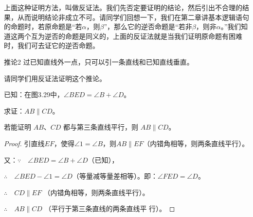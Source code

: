上面这种证明方法，叫做反证法。我们先否定要证明的结论，然后引出不合理的结果，从而说明结论非成立不可。请同学们回想一下，我们在第二章讲基本逻辑语句的命题时，若原命题是“若$\alpha$，则$\beta$”，那么它的逆否命题是“若非$\beta$，则非$\alpha$。”我们知道这两个互为逆否的命题是同义的，上面的反证法就是当我们证明原命题有困难时，我们可去证它的逆否命题。

\begin{Deduction}{推论2} 
  过已知直线外一点，只可以引一条直线和已知直线垂直。   
\end{Deduction}

请同学们用反证法证明这个推论。

\begin{example}
已知：在图3.29中，$\angle BED=\angle B+\angle D$。

求证：$AB\parallel CD$。
\end{example}

\begin{analyze}
若能证明 $AB$、$CD$ 都与第三条直线平行，则 $AB\parallel CD$。
\end{analyze}

\begin{proof}
引直线$EF$，使得$\angle 1=\angle B$，则$AB\parallel EF$（内错角相等，则两条直线平行）。

又：$\because\quad \angle BED=\angle B+\angle D$（已知），

$\therefore\quad \angle BED-\angle 1=\angle D$（等量减等量差相等）。即：$\angle FED=\angle D$。

$\therefore\quad CD\parallel EF$ （内错角相等，则两条直线平行）。

$\therefore\quad AB\parallel CD$ （平行于第三条直线的两条直线平
行）。
\end{proof}

\begin{figure}
  \begin{minipage}[t]{0.48\linewidth}
    \centering
\begin{tikzpicture}[>=latex, scale=1]
    \end{tikzpicture}
    \caption{}
    \end{minipage}
    \begin{minipage}[t]{0.48\linewidth}
    \centering
    \begin{tikzpicture}[>=latex, scale=1]
    \end{tikzpicture}
    \caption{}
  \end{minipage}
\end{figure}

